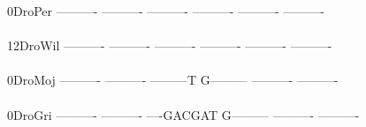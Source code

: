 \documentclass[11pt,twoside,reqno,a4paper]{article}
\begin{document}
{0\hspace*{4\charwidth}DroPer	----------	----------	----------	----------	----------	----------	\\
\hspace*{5\charwidth}\hspace*{7\charwidth}\hspace*{1\charwidth}\hspace*{1\charwidth}\hspace*{1\charwidth}\hspace*{1\charwidth}\hspace*{1\charwidth}\hspace*{1\charwidth}\\
12\hspace*{3\charwidth}DroWil	----------	----------	----------	----------	----------	----------	\\
\hspace*{5\charwidth}\hspace*{7\charwidth}\hspace*{1\charwidth}\hspace*{1\charwidth}\hspace*{1\charwidth}\hspace*{1\charwidth}\hspace*{1\charwidth}\hspace*{1\charwidth}\\
0\hspace*{4\charwidth}DroMoj	----------	----------	---------T	G---------	----------	----------	\\
\hspace*{5\charwidth}\hspace*{7\charwidth}\hspace*{1\charwidth}\hspace*{1\charwidth}\hspace*{1\charwidth}\hspace*{1\charwidth}\hspace*{1\charwidth}\hspace*{1\charwidth}\\
0\hspace*{4\charwidth}DroGri	----------	----------	----GACGAT	G---------	----------	----------	\\
\hspace*{5\charwidth}\hspace*{7\charwidth}\hspace*{1\charwidth}\hspace*{1\charwidth}\hspace*{1\charwidth}\hspace*{1\charwidth}\hspace*{1\charwidth}\hspace*{1\charwidth}\\
}
\end{document}
